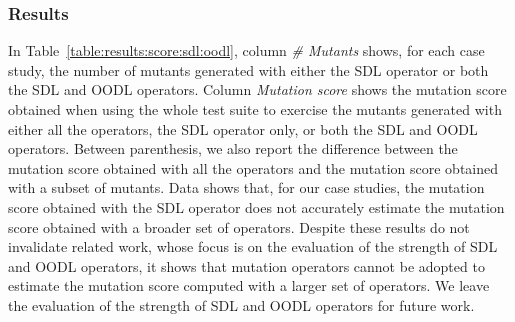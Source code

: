 


\subsubsection*{Results}



In Table~\ref{table:results:score:sdl:oodl}, column \emph{\# Mutants} shows, for each case study, the number of mutants generated with either the SDL operator or both the SDL and OODL operators. 
Column \emph{Mutation score} shows the mutation score obtained when using the whole test suite to exercise the mutants generated with either all the operators, the SDL operator only, or both the SDL and OODL operators. Between parenthesis, we also report the difference between the mutation score obtained with all the operators and the mutation score obtained with a subset of mutants. {Data shows that, for our case studies, the mutation score obtained with the SDL operator does not accurately estimate the mutation score obtained with a broader set of operators. Despite these results do not invalidate related work, whose focus is on the evaluation of the strength of SDL and OODL operators, it shows that mutation operators cannot be adopted to estimate the mutation score computed with a larger set of operators. We leave the evaluation of the strength of SDL and OODL operators for future work.}




%
%

